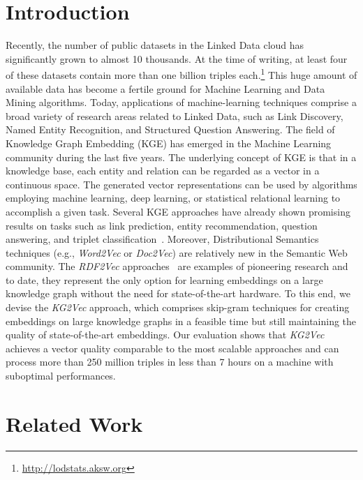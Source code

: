 \documentclass[graybox]{archivesofdatascience}
\newcommand{\ktvplain}{KG2Vec\xspace}
\newcommand{\ktv}{\textit{\ktvplain}\xspace}
\newcommand{\wtv}{\textit{Word2Vec}\xspace}
\newcommand{\dtv}{\textit{Doc2Vec}\xspace}
\newcommand{\rtv}{\textit{RDF2Vec}\xspace}
\begin{document}
\section{Introduction}

Recently, the number of public datasets in the Linked Data cloud has significantly grown to almost 10 thousands.
At the time of writing, at least four of these datasets contain more than one billion triples each.\footnote{\url{http://lodstats.aksw.org}}
This huge amount of available data has become a fertile ground for Machine Learning and Data Mining algorithms.
Today, applications of machine-learning techniques comprise a broad variety of research areas related to Linked Data, such as Link Discovery, Named Entity Recognition, and Structured Question Answering. 
The field of Knowledge Graph Embedding (KGE) has emerged in the Machine Learning community during the last five years.
The underlying concept of KGE is that in a knowledge base, each entity and relation can be regarded as a vector in a continuous space.
The generated vector representations can be used by algorithms employing machine learning, deep learning, or statistical relational learning to accomplish a given task.
Several KGE approaches have already shown promising results on tasks such as link prediction, entity recommendation, question answering, and triplet classification~\citep{TransG/xiao2015transg,PTransE/DBLP:journals/corr/LinLS15,TransR/lin2015learning,nickel2016holographic}. 
Moreover, Distributional Semantics techniques (e.g., \wtv or \dtv) are relatively new in the Semantic Web community.
The \rtv approaches~\citep{ristoski2016rdf2vec,cochez2017biased} are examples of pioneering research and to date, they represent the only option for learning embeddings on a large knowledge graph without the need for state-of-the-art hardware.
To this end, we devise the \ktv approach, which comprises skip-gram techniques for creating embeddings on large knowledge graphs in a feasible time but still maintaining the quality of state-of-the-art embeddings.
Our evaluation shows that \ktv achieves a vector quality comparable to the most scalable approaches and can process more than 250 million triples in less than 7 hours on a machine with suboptimal performances.



\section{Related Work} \label{sec:related}
\end{document}
